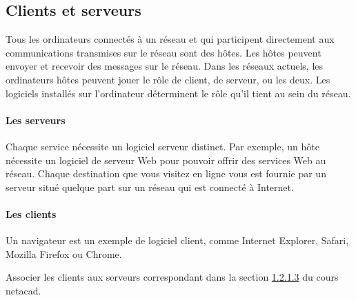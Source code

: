 \subsection{Clients et serveurs}

Tous les ordinateurs connectés à un réseau et qui participent directement aux communications transmises sur le réseau sont des hôtes. Les hôtes peuvent envoyer et recevoir des messages sur le réseau. Dans les réseaux actuels, les ordinateurs hôtes peuvent jouer le rôle de client, de serveur, ou les deux. Les logiciels installés sur l'ordinateur déterminent le rôle qu'il tient au sein du réseau.

\paragraph{Les serveurs}
 Chaque service nécessite un logiciel serveur distinct. Par exemple, un hôte nécessite un logiciel de serveur Web pour pouvoir offrir des services Web au réseau. Chaque destination que vous visitez en ligne vous est fournie par un serveur situé quelque part sur un réseau qui est connecté à Internet.

\paragraph{Les clients}

Un navigateur est un exemple de logiciel client, comme Internet Explorer, Safari, Mozilla Firefox ou Chrome.

\begin{UPSTIactivite}Associer les clients aux serveurs correspondant dans la section \href{https://static-course-assets.s3.amazonaws.com/NetEss/fr/index.html#1.2.1.3}{1.2.1.3} du cours netacad.

\end{UPSTIactivite}
